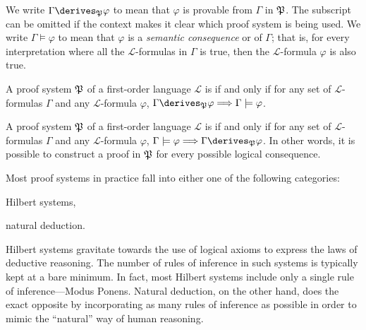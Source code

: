 \begin{notation}
     \label{notation:provable}
    We write \( \Gamma \derives_{\proofsystem{P}} \varphi \) to mean
    that \( \varphi \) is provable from \( \Gamma \) in \( \mathfrak{P} \).
    The subscript can be omitted if the context makes it clear which proof system is being used.
    We write \( \Gamma \models \varphi \) to mean that \( \varphi \) is a \emph{semantic consequence} or 
    of \( \Gamma \); that is, for every interpretation where all the \( \mathcal{L} \)-formulas in \( \Gamma \)
    is true, then the \( \mathcal{L} \)-formula \( \varphi \) is also true.
\end{notation}

\begin{dfn}[Soundness]
     \label{dfn:soundness-of-proof-system}
    A proof system \( \mathfrak{P} \) of a first-order language \( \mathcal{L} \) is 
    if and only if for any set of \( \mathcal{L} \)-formulas \( \Gamma \) and any \( \mathcal{L} \)-formula
    \( \varphi \), \( \Gamma \derives_{\proofsystem{P}} \varphi {\implies} \Gamma \models \varphi \).
\end{dfn}

\begin{dfn}[Completeness]
     \label{dfn:completeness-of-proof-system}
    A proof system \( \mathfrak{P} \) of a first-order language \( \mathcal{L} \) is 
    if and only if for any set of \( \mathcal{L} \)-formulas \( \Gamma \) and any \( \mathcal{L} \)-formula
    \( \varphi \), \( \Gamma \models \varphi {\implies} \Gamma \derives_{\proofsystem{P}} \varphi \). In other
    words, it is possible to construct a proof in \( \mathfrak{P} \) for every possible logical consequence.
\end{dfn}

\noindent
Most proof systems in practice fall into either one of the following categories:
\begin{enumerate*}[label=(\roman*)]
    \item Hilbert systems,
    \item natural deduction.
\end{enumerate*}
Hilbert systems gravitate towards the use of logical axioms to express the laws of deductive reasoning. The number of rules
of inference in such systems is typically kept at a bare minimum.
In fact, most Hilbert systems include only a single rule of inference---Modus Ponens.
Natural deduction, on the other hand, does the exact opposite by incorporating as many rules of inference as possible in order
to mimic the ``natural'' way of human reasoning.


